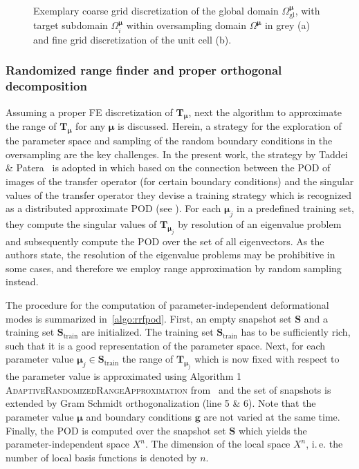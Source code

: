 \documentclass[a4paper]{eccomas_paper-2024}
\makeatletter
\newcommand{\ie}{i.\,e.\@\xspace}
\newcommand{\m}{\bm\mu}
\newcommand{\gl}{\mathrm{gl}}
\makeatother
\begin{document}
\begin{figure}
    \centering
    
    \caption{Exemplary coarse grid discretization of the global domain $\varOmega^{\m}_{\gl}$, with target subdomain $\varOmega^{\m}_i$ within oversampling domain $\varOmega^{\m}$ in grey (a) and fine grid discretization of the unit cell (b).}\label{fig:oversampling_domain}
\end{figure}



\subsubsection{Randomized range finder and proper orthogonal decomposition} %
\label{sec:Randomized range finder and POD}

Assuming a proper FE discretization of $\bm{T}_{\m}$, next the algorithm to approximate the range of $\bm{T}_{\m}$ for any $\m$ is discussed.
Herein, a strategy for the exploration of the parameter space and sampling of the random boundary conditions in the oversampling are the key challenges.
In the present work, the strategy by Taddei \& Patera~\cite{Taddei2018Localization} is adopted in which based on the connection between the POD of images of the transfer operator (for certain boundary conditions) and the singular values of the transfer operator they devise a training strategy which is recognized as a distributed approximate POD (see \cite{Himpe2018Hierarchical}).
For each $\m_j$ in a predefined training set, they compute the singular values of $\bm{T}_{\m_j}$ by resolution of an eigenvalue problem and subsequently compute the POD over the set of all eigenvectors.
As the authors state, the resolution of the eigenvalue problems may be prohibitive in some cases, and therefore we employ range approximation by random sampling instead.

The procedure for the computation of parameter-independent deformational modes is summarized in~\cref{algo:rrfpod}.
First, an empty snapshot set $\bm{S}$ and a training set $\bm{S}_{\mathrm{train}}$ are initialized.
The training set $\bm{S}_{\mathrm{train}}$ has to be sufficiently rich, such that it is a good representation of the parameter space.
Next, for each parameter value $\m_j\in\bm{S}_{\mathrm{train}}$ the range of $\bm{T}_{\m_j}$ which is now fixed with respect to the parameter value is approximated using Algorithm 1 \textsc{AdaptiveRandomizedRangeApproximation} from~\cite{Buhr2018Randomized} and the set of snapshots is extended by Gram Schmidt orthogonalization (line 5 \& 6).
Note that the parameter value $\m$ and boundary conditions $\bm{g}$ are not varied at the same time.
Finally, the POD is computed over the snapshot set $\bm{S}$ which yields the parameter-independent space $X^n$.
The dimension of the local space $X^n$, \ie{} the number of local basis functions is denoted by $n$.
\end{document}

